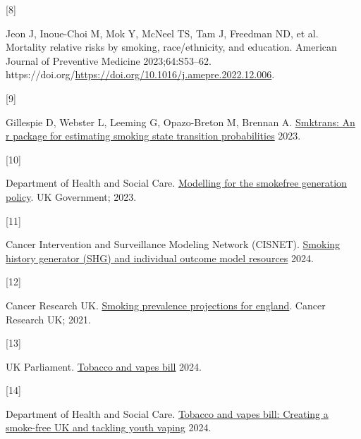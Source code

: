 \documentclass[
  letterpaper,
  DIV=11,
  numbers=noendperiod]{scrartcl}
\newlength{\cslhangindent}
\newlength{\csllabelwidth}
\newenvironment{CSLReferences}[2] %
 {\begin{list}{}{%
  \setlength{\itemindent}{0pt}
  \setlength{\leftmargin}{0pt}
  \setlength{\parsep}{0pt}
  \ifodd #1
   \setlength{\leftmargin}{\cslhangindent}
   \setlength{\itemindent}{-1\cslhangindent}
  \fi
  \setlength{\itemsep}{#2\baselineskip}}}
 {\end{list}}
\newcommand{\CSLLeftMargin}[1]{\parbox[t]{\csllabelwidth}{\strut#1\strut}}
\newcommand{\CSLRightInline}[1]{\parbox[t]{\linewidth - \csllabelwidth}{\strut#1\strut}}
\begin{document}
\begin{CSLReferences}{0}{0}
\CSLLeftMargin{{[}8{]} }%
\CSLRightInline{Jeon J, Inoue-Choi M, Mok Y, McNeel TS, Tam J, Freedman
ND, et al. Mortality relative risks by smoking, race/ethnicity, and
education. American Journal of Preventive Medicine 2023;64:S53--62.
https://doi.org/\url{https://doi.org/10.1016/j.amepre.2022.12.006}.}

\CSLLeftMargin{{[}9{]} }%
\CSLRightInline{Gillespie D, Webster L, Leeming G, Opazo-Breton M,
Brennan A.
\href{https://stapm.gitlab.io/smoking_state_transitions.html}{Smktrans:
An r package for estimating smoking state transition probabilities}
2023.}

\CSLLeftMargin{{[}10{]} }%
\CSLRightInline{Department of Health and Social Care.
\href{https://www.gov.uk/government/publications/smokefree-generation-policy-modelling-report/modelling-for-the-smokefree-generation-policy}{Modelling
for the smokefree generation policy}. UK Government; 2023.}

\CSLLeftMargin{{[}11{]} }%
\CSLRightInline{Cancer Intervention and Surveillance Modeling Network
(CISNET).
\href{https://resources.cisnet.cancer.gov/projects/\#shg/iomr/resources}{Smoking
history generator (SHG) and individual outcome model resources} 2024.}

\CSLLeftMargin{{[}12{]} }%
\CSLRightInline{Cancer Research UK.
\href{https://www.cancerresearchuk.org/sites/default/files/cancer_research_uk_smoking_prevalence_projections_england_0.pdf}{Smoking
prevalence projections for england}. Cancer Research UK; 2021.}

\CSLLeftMargin{{[}13{]} }%
\CSLRightInline{UK Parliament.
\href{https://bills.parliament.uk/bills/3879}{Tobacco and vapes bill}
2024.}

\CSLLeftMargin{{[}14{]} }%
\CSLRightInline{Department of Health and Social Care.
\href{https://www.gov.uk/government/publications/the-tobacco-and-vapes-bill-creating-a-smoke-free-uk-and-tackling-youth-vaping/tobacco-and-vapes-bill-creating-a-smoke-free-uk-and-tackling-youth-vaping}{Tobacco
and vapes bill: Creating a smoke-free UK and tackling youth vaping}
2024.}

\end{CSLReferences}
\end{document}
